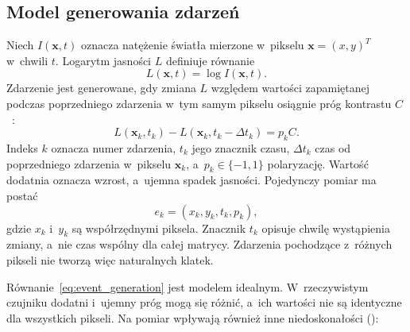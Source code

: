 \subsection{Model generowania zdarzeń}
\label{subsec:model_zdarzen}

Niech $I(\mathbf{x},t)$ oznacza natężenie światła mierzone w~pikselu $\mathbf{x}=(x,y)^T$ w~chwili $t$. Logarytm jasności $L$ definiuje równanie
\begin{equation}
    L(\mathbf{x},t)=\log I(\mathbf{x},t).
    \label{eq:log_intensity}
\end{equation}
Zdarzenie jest generowane, gdy zmiana $L$ względem wartości zapamiętanej podczas poprzedniego zdarzenia w~tym samym pikselu osiągnie próg kontrastu $C$~\cite{gallego2022event,rebecq2018esim}:
\begin{equation}
    L(\mathbf{x}_k,t_k)-L(\mathbf{x}_k,t_k-\Delta t_k)=p_k C.
    \label{eq:event_generation}
\end{equation}
Indeks $k$ oznacza numer zdarzenia, $t_k$ jego znacznik czasu, $\Delta t_k$ czas od poprzedniego zdarzenia w~pikselu $\mathbf{x}_k$, a~$p_k\in\{-1,1\}$ polaryzację. Wartość dodatnia oznacza wzrost, a~ujemna spadek jasności. Pojedynczy pomiar ma postać
\begin{equation}
    e_k=(x_k,y_k,t_k,p_k),
    \label{eq:event_tuple}
\end{equation}
gdzie $x_k$ i~$y_k$ są współrzędnymi piksela. Znacznik $t_k$ opisuje chwilę wystąpienia zmiany, a~nie czas wspólny dla całej matrycy. Zdarzenia pochodzące z~różnych pikseli nie tworzą więc naturalnych klatek.

Równanie~\eqref{eq:event_generation} jest modelem idealnym. W~rzeczywistym czujniku dodatni i~ujemny próg mogą się różnić, a~ich wartości nie są identyczne dla wszystkich pikseli. Na pomiar wpływają również inne niedoskonałości (\cite{gallego2022event}):

